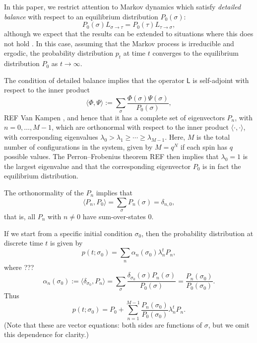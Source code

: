 \documentclass[10pt]{article}
\newcommand{\defeq}{:=}
\newcommand{\LL}{\mathsf{L}}
\renewcommand{\L}[2]{L_{#2 \to #1}}  %
\newcommand{\p}{p}
\newcommand{\Peq}{P_0}
\newcommand{\ip}[2]{\langle #1, #2 \rangle}
\begin{document}
In this paper, we restrict attention to Markov dynamics which satisfy
\emph{detailed balance} with respect to an equilibrium distribution
$\Peq(\sigma)$:
\begin{equation}
 \Peq(\sigma) \L{\tau}{\sigma} =  \Peq(\tau) \L{\sigma}{\tau},
\end{equation}
although we expect that the results can be extended to situations where this does not hold 
\cite{GaveauSchulmanJMP1998}.
In this case, assuming that the Markov process is irreducible and ergodic, the
probability distribution $p_t$ at time $t$ converges to the equilibrium distribution
$\Peq$
as $t \to \infty$.

The condition of detailed balance implies that the operator $\LL$ is
self-adjoint with respect to the inner product
\begin{equation}
\ip{\Phi}{\Psi} \defeq \sum_{\sigma} \frac{\Phi(\sigma)
\Psi(\sigma)}{\Peq(\sigma)},
\end{equation}
REF Van Kampen , and hence that it has a complete
set of eigenvectors $P_n$, with $n=0,\ldots,M-1$, which are orthonormal with
respect to the inner product $\ip{\cdot}{\cdot}$, with corresponding
eigenvalues
$\lambda_0 > \lambda_1 \ge \cdots \ge \lambda_{M-1}$. Here, $M$ is the total
number of configurations in the system, given by $M = q^N$ if each spin has $q$
possible values. The Perron--Frobenius
theorem REF then implies that $\lambda_0 = 1$ is the largest eigenvalue and
that the corresponding
eigenvector $P_0$ is in fact the equilibrium distribution.

The orthonormality of the $P_n$ implies that
\begin{equation}
 \ip{P_n}{P_0} = \sum_\sigma P_n(\sigma) = \delta_{n,0},
\end{equation}
that is, all $P_n$ with $n \neq 0$ have sum-over-states $0$.


If we start from a specific initial condition $\sigma_0$, then
the probability distribution at discrete time $t$ is given by
\begin{equation}
 \p(t; \sigma_0) = \sum_n \alpha_n(\sigma_0) \lambda_n^t P_n,
\end{equation}
where ???
\begin{equation}
 \alpha_n(\sigma_0) \defeq \ip{\delta_{\sigma_0}}{P_n} = \sum_\sigma
\frac{\delta_{\sigma_0}(\sigma) P_n(\sigma)}{\Peq(\sigma)} =
\frac{P_n(\sigma_0)}{\Peq(\sigma_0)}.
\end{equation}
Thus
\begin{equation}
  \p(t; \sigma_0) = P_0 + \sum_{n=1}^{M-1} \frac{P_n(\sigma_0)}{\Peq(\sigma_0)}
\lambda_n^t P_n.
\end{equation}
(Note that these are vector equations: both sides are functions of $\sigma$,
but we omit this dependence for clarity.)
\end{document}
